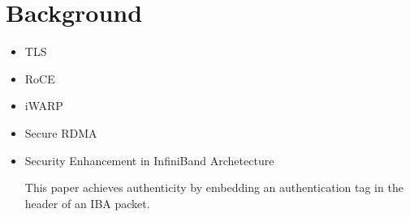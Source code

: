 \section{Background}
\label{sec:background}

\begin{itemize}
    \item{TLS}
    \item{RoCE}
    \item{iWARP}
    \item{Secure RDMA}
\end{itemize}

\begin{itemize}
\item{Security Enhancement in InfiniBand Archetecture}~\cite{Lee:2005:SEI:1053727.1054449}

    This paper achieves authenticity by embedding an authentication tag in the
    header of an IBA packet.

\end{itemize}
